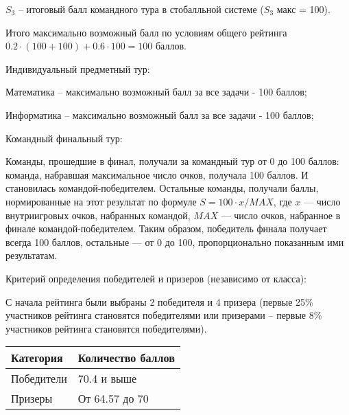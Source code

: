 $S_3$ – итоговый балл командного тура в стобалльной системе ($S_3$ макс = 100).

Итого максимально возможный балл по условиям общего рейтинга $0.2 \cdot (100+100) + 0.6 \cdot 100 = 100$ баллов.

Индивидуальный предметный тур:

Математика – максимально возможный балл за все задачи - 100 баллов; 

Информатика – максимально возможный балл за все задачи - 100 баллов; 

Командный финальный тур:

Команды, прошедшие в финал, получали за командный тур от 0 до 100 баллов: команда, набравшая максимальное число очков, получала 100 баллов. И становилась командой-победителем. Остальные команды, получали баллы, нормированные на этот результат по формуле $S = 100 \cdot x/MAX$, где $x$ — число внутриигровых очков, набранных командой, $MAX$ — число очков, набранное в финале командой-победителем. Таким образом, победитель финала получает всегда 100 баллов, остальные — от 0 до 100, пропорционально показанным ими результатам.

Критерий определения победителей и призеров (независимо от класса): 

С начала рейтинга были выбраны 2 победителя и 4 призера (первые 25\% участников рейтинга становятся победителями или призерами – первые 8\% участников рейтинга становятся победителями).

\begin{center}
    \begin{tabular}{|l|l|}
        \hline
        Категория&Количество баллов\\
        \hline
        Победители&70.4 и выше\\
        \hline
        Призеры&От 64.57 до 70\\
        \hline
    \end{tabular}
\end{center}